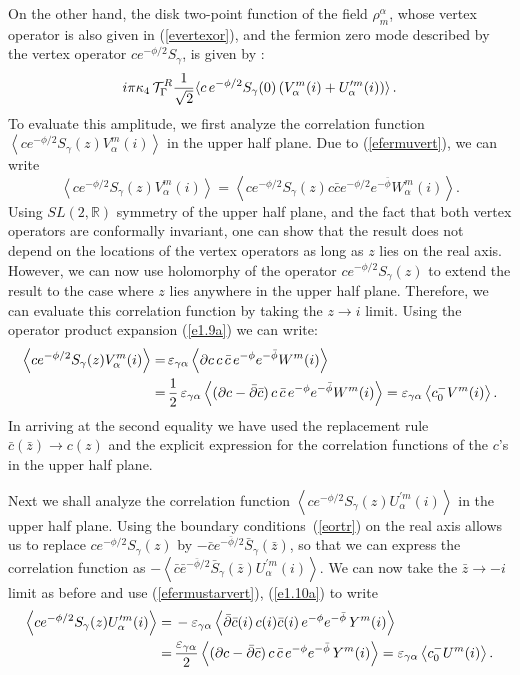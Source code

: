 \documentclass[12pt,a4paper]{article}
\newcommand{\be}{\begin{equation}}
\newcommand{\ee}{\end{equation}}
\newcommand{\refb}[1]{(\ref{#1})}
\newcommand{\IR}{\mathds{R}}
\newcommand{\p}{\partial}
\newcommand{\I}{\mathrm{i}}
\def\({\left(}
\def\){\right)}
\newcommand{\ve}{\varepsilon}
\newcommand{\cT}{\mathcal{T}}
\def\bz{\bar z}
\def\I{i}
\def\xxi{\rho}
\begin{document}
On the other hand, the disk two-point function of the field $\xxi_m^\alpha$,
whose vertex operator is also
given in \refb{evertexor}, and the fermion zero mode described by the vertex operator
$c e^{-\phi/2}S_\gamma$, is given by \cite{Alexandrov:2021shf}:
\be
\label{e121a.1}
\I\pi\kappa_4\, \cT^R_\Gamma {1\over \sqrt 2} \langle c \, e^{-\phi/2} S_\gamma(0)
\( V_\alpha^{m} (i)
+ U^{\prime m}_{\alpha}(i)\) \rangle\, .
\ee
To evaluate this amplitude, we first analyze the correlation function
$\left\langle c e^{-\phi/2} S_\gamma (z) V_\alpha^{m} (i)\right\rangle$
in the upper half plane. Due to \refb{efermuvert}, we can write
\be\label{eainitial}
\left\langle c e^{-\phi/2} S_\gamma (z) V_\alpha^{m} (i)\right\rangle
= \left\langle c e^{-\phi/2} S_\gamma (z) c\bar c e^{-\phi/2}e^{-\bar\phi}
W_\alpha^{m} (i)\right\rangle .
\ee
Using $SL(2,\IR)$ symmetry of the upper half plane, and
the fact that both vertex operators are conformally invariant, one can show that the
result does not depend on the locations of the vertex operators as long as $z$ lies on the
real axis. However, we can now use holomorphy of the operator $c e^{-\phi/2} S_\gamma (z)$
to extend the result to the case where $z$ lies anywhere in the upper half plane.
Therefore, we can
evaluate this correlation function by taking the $z\to i$ limit.
Using the operator product expansion \refb{e1.9a}
we can write:
\be \label{ea.4}
\begin{split}
 \left\langle c e^{-\phi/2} S_\gamma (z) V_\alpha^{m} (i)\right\rangle
=&\, \ve_{\gamma\alpha} \left\langle \p c \, c\, \bar c \, e^{-\phi}e^{-\bar\phi}
W^m(i) \right\rangle
\\
=&\, {1\over 2}\,
\ve_{\gamma\alpha} \left\langle (\p c-\bar\p \bar c) \, c\, \bar c \, e^{-\phi}e^{-\bar\phi}
W^m(i) \right\rangle=
\ve_{\gamma\alpha} \left\langle c_0^- V^m(i) \right\rangle .
\end{split}
\ee
In arriving at the second equality we have used the replacement rule $\bar c(\bar z) \to c(z)$ and the explicit
expression for the correlation functions of the $c$'s in the upper half plane.

Next we shall analyze the correlation function
$\left\langle c e^{-\phi/2} S_\gamma (z) U^{\prime m}_{\alpha} (i) \right\rangle$ in the
upper half plane. Using the boundary conditions~\refb{eortr} on the real axis allows us to replace $c e^{-\phi/2} S_\gamma (z)$
by $-\bar c e^{-\bar\phi/2} \bar S_\gamma (\bar z)$, so that we can express the correlation function as
$-\left\langle \bar c \bar e^{-\bar\phi/2} \bar S_\gamma (\bar z)U^{\prime m}_{\alpha} (i) \right\rangle$.
We can now take the $\bz\to -i$ limit as before
and use \refb{efermustarvert}, \refb{e1.10a}  to write
\be
\label{ea.7}
\begin{split}
 \left\langle c e^{-\phi/2} S_\gamma (z) U^{\prime m}_\alpha (i)\right\rangle
=&\, -\ve_{\gamma\alpha}  \left\langle \bar\p \bar c (i) \, c(\I) \bar c(\I)\, e^{-\phi}e^{-\bar\phi}\, Y^{m}(i)
\right\rangle
\\
= &\, {\ve_{\gamma\alpha}\over 2}   \left\langle (\p c-\bar\p \bar c) \, c \, \bar c\,
e^{-\phi}e^{-\bar\phi}\, Y^{m}(i)
\right\rangle = \ve_{\gamma\alpha} \left\langle c_0^-U^{m}(i)
\right\rangle .
\end{split}
\ee
\end{document}
